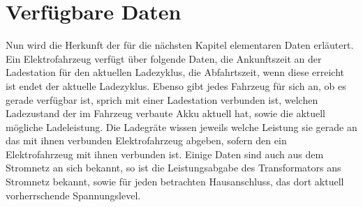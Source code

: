 \section{Verfügbare Daten}
\label{cap:background_sec:setting}
Nun wird die Herkunft der für die nächsten Kapitel elementaren Daten erläutert. Ein Elektrofahrzeug verfügt über folgende Daten, die Ankunftszeit an der Ladestation für den aktuellen Ladezyklus, die Abfahrtszeit, wenn diese erreicht ist endet der aktuelle Ladezyklus. Ebenso gibt jedes Fahrzeug für sich an, ob es gerade verfügbar ist, sprich mit einer Ladestation verbunden ist, welchen Ladezustand der im Fahrzeug verbaute Akku aktuell hat, sowie die aktuell mögliche Ladeleistung. Die Ladegräte wissen jeweils welche Leistung sie gerade an das mit ihnen verbunden Elektrofahrzeug abgeben, sofern den ein Elektrofahrzeug mit ihnen verbunden ist. Einige Daten sind auch aus dem Stromnetz an sich bekannt, so ist die Leistungsabgabe des Transformators ans Stromnetz bekannt, sowie für jeden betrachten Hausanschluss, das dort aktuell vorherrschende Spannungslevel.

